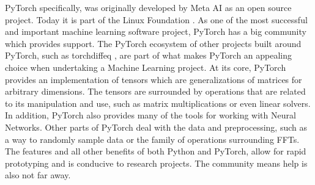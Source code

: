 PyTorch specifically, was originally developed by Meta AI as an open source project. Today it is part of the Linux Foundation \autocite{jimzemlinWelcomingPyTorchLinux2022}. As one of the most successful and important machine learning software project, PyTorch has a big community which provides support. The PyTorch ecosystem of other projects built around PyTorch, such as torchdiffeq \autocite{Chen_torchdiffeq_2021}, are part of what makes PyTorch an appealing choice when undertaking a Machine Learning project. At its core, PyTorch provides an implementation of tensors which are generalizations of matrices for arbitrary dimensions. The tensors are surrounded by operations that are related to its manipulation and use, such as matrix multiplications or even linear solvers. In addition, PyTorch also provides many of the tools for working with Neural Networks. Other parts of PyTorch deal with the data and preprocessing, such as a way to randomly sample data or the family of operations surrounding FFTs. The features and all other benefits of both Python and PyTorch, allow for rapid prototyping and is conducive to research projects. The community means help is also not far away.



